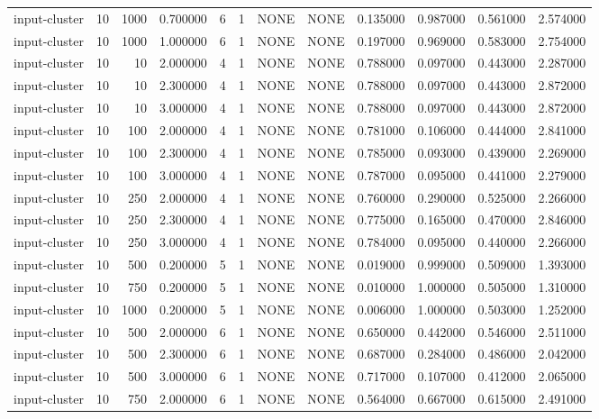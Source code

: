 \begin{tabular}{lrrrllllrrrr}
input-cluster & 10 & 1000 & 0.700000 & 6 & 1 & NONE & NONE & 0.135000 & 0.987000 & 0.561000 & 2.574000 \\
input-cluster & 10 & 1000 & 1.000000 & 6 & 1 & NONE & NONE & 0.197000 & 0.969000 & 0.583000 & 2.754000 \\
input-cluster & 10 & 10 & 2.000000 & 4 & 1 & NONE & NONE & 0.788000 & 0.097000 & 0.443000 & 2.287000 \\
input-cluster & 10 & 10 & 2.300000 & 4 & 1 & NONE & NONE & 0.788000 & 0.097000 & 0.443000 & 2.872000 \\
input-cluster & 10 & 10 & 3.000000 & 4 & 1 & NONE & NONE & 0.788000 & 0.097000 & 0.443000 & 2.872000 \\
input-cluster & 10 & 100 & 2.000000 & 4 & 1 & NONE & NONE & 0.781000 & 0.106000 & 0.444000 & 2.841000 \\
input-cluster & 10 & 100 & 2.300000 & 4 & 1 & NONE & NONE & 0.785000 & 0.093000 & 0.439000 & 2.269000 \\
input-cluster & 10 & 100 & 3.000000 & 4 & 1 & NONE & NONE & 0.787000 & 0.095000 & 0.441000 & 2.279000 \\
input-cluster & 10 & 250 & 2.000000 & 4 & 1 & NONE & NONE & 0.760000 & 0.290000 & 0.525000 & 2.266000 \\
input-cluster & 10 & 250 & 2.300000 & 4 & 1 & NONE & NONE & 0.775000 & 0.165000 & 0.470000 & 2.846000 \\
input-cluster & 10 & 250 & 3.000000 & 4 & 1 & NONE & NONE & 0.784000 & 0.095000 & 0.440000 & 2.266000 \\
input-cluster & 10 & 500 & 0.200000 & 5 & 1 & NONE & NONE & 0.019000 & 0.999000 & 0.509000 & 1.393000 \\
input-cluster & 10 & 750 & 0.200000 & 5 & 1 & NONE & NONE & 0.010000 & 1.000000 & 0.505000 & 1.310000 \\
input-cluster & 10 & 1000 & 0.200000 & 5 & 1 & NONE & NONE & 0.006000 & 1.000000 & 0.503000 & 1.252000 \\
input-cluster & 10 & 500 & 2.000000 & 6 & 1 & NONE & NONE & 0.650000 & 0.442000 & 0.546000 & 2.511000 \\
input-cluster & 10 & 500 & 2.300000 & 6 & 1 & NONE & NONE & 0.687000 & 0.284000 & 0.486000 & 2.042000 \\
input-cluster & 10 & 500 & 3.000000 & 6 & 1 & NONE & NONE & 0.717000 & 0.107000 & 0.412000 & 2.065000 \\
input-cluster & 10 & 750 & 2.000000 & 6 & 1 & NONE & NONE & 0.564000 & 0.667000 & 0.615000 & 2.491000 \\

\end{tabular}
